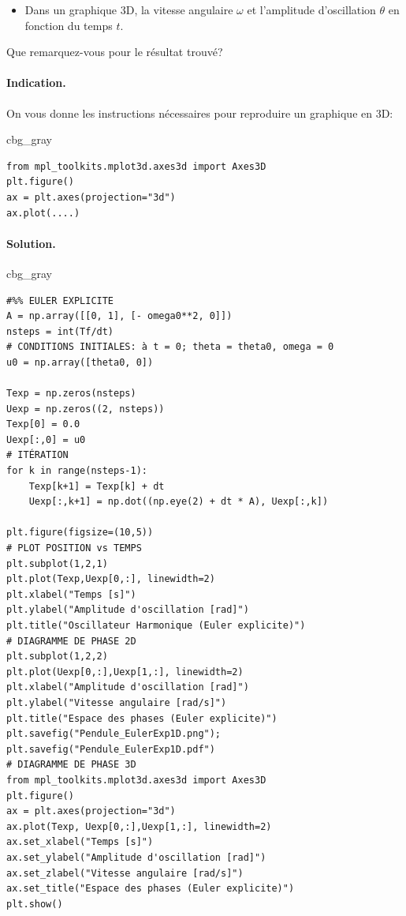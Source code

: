 \documentclass[%
oneside,                 %
final,                   %
10pt,french]{article}
\newenvironment{_cod_tight}[1]{
   \def\FrameCommand{\colorbox{#1}}
   \FrameRule0.6pt\MakeFramed {\FrameRestore}\vskip3mm}
   {\vskip0mm\endMakeFramed}
\newenvironment{cod}[1]{
\bgroup\rmfamily
\fboxsep=0mm\relax
\begin{_cod_tight}{#1}
\list{}{\parsep=-2mm\parskip=0mm\topsep=0pt\leftmargin=2mm
\rightmargin=2\leftmargin\leftmargin=4pt\relax}
\item\relax}
{\endlist\end{_cod_tight}\egroup}
\newenvironment{doconceexercise}{}{}
\begin{document}
\begin{doconceexercise}
\begin{itemize}
\item Dans un graphique 3D, la vitesse angulaire $\omega$ et l'amplitude d'oscillation $\theta$ en fonction du temps $t$.
\end{itemize}

\noindent
Que remarquez-vous pour le résultat trouvé?


\paragraph{Indication.}
On vous donne les instructions nécessaires pour reproduire un graphique en 3D:
\begin{cod}{cbg_gray}\begin{verbatim}
from mpl_toolkits.mplot3d.axes3d import Axes3D
plt.figure()
ax = plt.axes(projection="3d")
ax.plot(....)
\end{verbatim}
\end{cod}
\noindent



\paragraph{Solution.}
\begin{cod}{cbg_gray}\begin{verbatim}
#%% EULER EXPLICITE
A = np.array([[0, 1], [- omega0**2, 0]])
nsteps = int(Tf/dt)
# CONDITIONS INITIALES: à t = 0; theta = theta0, omega = 0
u0 = np.array([theta0, 0])

Texp = np.zeros(nsteps)
Uexp = np.zeros((2, nsteps))
Texp[0] = 0.0
Uexp[:,0] = u0
# ITÉRATION
for k in range(nsteps-1):
    Texp[k+1] = Texp[k] + dt
    Uexp[:,k+1] = np.dot((np.eye(2) + dt * A), Uexp[:,k])
    
plt.figure(figsize=(10,5))
# PLOT POSITION vs TEMPS
plt.subplot(1,2,1)
plt.plot(Texp,Uexp[0,:], linewidth=2)
plt.xlabel("Temps [s]")
plt.ylabel("Amplitude d'oscillation [rad]")
plt.title("Oscillateur Harmonique (Euler explicite)")
# DIAGRAMME DE PHASE 2D
plt.subplot(1,2,2)
plt.plot(Uexp[0,:],Uexp[1,:], linewidth=2)
plt.xlabel("Amplitude d'oscillation [rad]")
plt.ylabel("Vitesse angulaire [rad/s]")
plt.title("Espace des phases (Euler explicite)")
plt.savefig("Pendule_EulerExp1D.png"); plt.savefig("Pendule_EulerExp1D.pdf")
# DIAGRAMME DE PHASE 3D
from mpl_toolkits.mplot3d.axes3d import Axes3D
plt.figure()
ax = plt.axes(projection="3d")
ax.plot(Texp, Uexp[0,:],Uexp[1,:], linewidth=2)
ax.set_xlabel("Temps [s]")
ax.set_ylabel("Amplitude d'oscillation [rad]")
ax.set_zlabel("Vitesse angulaire [rad/s]")
ax.set_title("Espace des phases (Euler explicite)")
plt.show()
\end{verbatim}
\end{cod}
\noindent


\end{doconceexercise}
\end{document}
